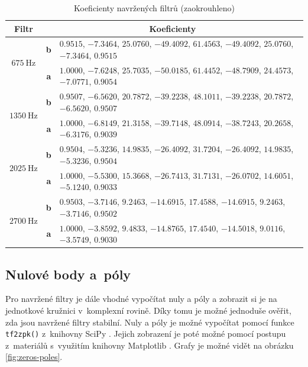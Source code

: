 \documentclass[a4paper, 11pt, final]{article}
\begin{document}
\begin{table}[!ht]
    \centering
    \begin{tabular}{|c|cl|}
        \hline
        \textbf{Filtr} & \multicolumn{2}{c|}{\textbf{Koeficienty}} \\
        \hline
        \multirow{2}{*}{$\SI{675}{\hertz}$} & \textbf{b} & $0.9515$, $-7.3464$, $25.0760$, $-49.4092$, $61.4563$, $-49.4092$, $25.0760$, $-7.3464$, $0.9515$ \\
            & \textbf{a} & $1.0000$, $-7.6248$, $25.7035$, $-50.0185$, $61.4452$, $-48.7909$, $24.4573$, $-7.0771$, $0.9054$ \\
        \hline
        \multirow{2}{*}{$\SI{1350}{\hertz}$} & \textbf{b} & $0.9507$, $-6.5620$, $20.7872$, $-39.2238$, $48.1011$, $-39.2238$, $20.7872$, $-6.5620$, $0.9507$ \\
            & \textbf{a} & $1.0000$, $-6.8149$, $21.3158$, $-39.7148$, $48.0914$, $-38.7243$, $20.2658$, $-6.3176$, $0.9039$ \\
        \hline
        \multirow{2}{*}{$\SI{2025}{\hertz}$} & \textbf{b} & $0.9504$, $-5.3236$, $14.9835$, $-26.4092$, $31.7204$, $-26.4092$, $14.9835$, $-5.3236$, $0.9504$ \\
            & \textbf{a} & $1.0000$, $-5.5300$, $15.3668$, $-26.7413$, $31.7131$, $-26.0702$, $14.6051$, $-5.1240$, $0.9033$ \\
        \hline
        \multirow{2}{*}{$\SI{2700}{\hertz}$} & \textbf{b} & $0.9503$, $-3.7146$, $9.2463$, $-14.6915$, $17.4588$, $-14.6915$, $9.2463$, $-3.7146$, $0.9502$ \\
            & \textbf{a} & $1.0000$, $-3.8592$, $9.4833$, $-14.8765$, $17.4540$, $-14.5018$, $9.0116$, $-3.5749$, $0.9030$ \\
        \hline
    \end{tabular}
    \caption{Koeficienty navržených filtrů (zaokrouhleno)\protect\footnotemark}
    \label{tab:filter-coefficients}
\end{table}

\subsection{Nulové body a~póly}

Pro navržené filtry je dále vhodné vypočítat nuly a póly a zobrazit si je na jednotkové kružnici v~komplexní rovině. Díky tomu je možné jednoduše ověřit, zda jsou navržené filtry stabilní. Nuly a póly je možné vypočítat pomocí funkce \texttt{tf2zpk()} z~knihovny SciPy \cite{scipy-reference}. Jejich zobrazení je poté možné pomocí postupu z~materiálů \cite{zmolikova-demo} s~využitím knihovny Matplotlib \cite{matplotlib-reference}. Grafy je možné vidět na obrázku \ref{fig:zeros-poles}.
\end{document}
